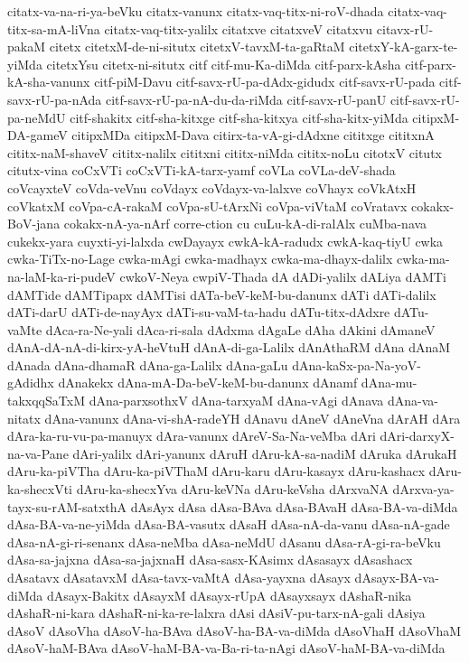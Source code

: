 {citatx-va-na-ri-ya-beVku
citatx-vanunx
citatx-vaq-titx-ni-roV-dhada
citatx-vaq-titx-sa-mA-liVna
citatx-vaq-titx-yalilx
citatxve
citatxveV
citatxvu
citavx-rU-pakaM
citetx
citetxM-de-ni-situtx
citetxV-tavxM-ta-gaRtaM
citetxY-kA-garx-te-yiMda
citetxYsu
citetx-ni-situtx
citf
citf-mu-Ka-diMda
citf-parx-kAsha
citf-parx-kA-sha-vanunx
citf-piM-Davu
citf-savx-rU-pa-dAdx-gidudx
citf-savx-rU-pada
citf-savx-rU-pa-nAda
citf-savx-rU-pa-nA-du-da-riMda
citf-savx-rU-panU
citf-savx-rU-pa-neMdU
citf-shakitx
citf-sha-kitxge
citf-sha-kitxya
citf-sha-kitx-yiMda
citipxM-DA-gameV
citipxMDa
citipxM-Dava
citirx-ta-vA-gi-dAdxne
cititxge
cititxnA
cititx-naM-shaveV
cititx-nalilx
cititxni
cititx-niMda
cititx-noLu
citotxV
citutx
citutx-vina
coCxVTi
coCxVTi-kA-tarx-yamf
coVLa
coVLa-deV-shada
coVcayxteV
coVda-veVnu
coVdayx
coVdayx-va-lalxve
coVhayx
coVkAtxH
coVkatxM
coVpa-cA-rakaM
coVpa-sU-tArxNi
coVpa-viVtaM
coVratavx
cokakx-BoV-jana
cokakx-nA-ya-nArf
corre-ction
cu
cuLu-kA-di-ralAlx
cuMba-nava
cukekx-yara
cuyxti-yi-lalxda
cwDayayx
cwkA-kA-radudx
cwkA-kaq-tiyU
cwka
cwka-TiTx-no-Lage
cwka-mAgi
cwka-madhayx
cwka-ma-dhayx-dalilx
cwka-ma-na-laM-ka-ri-pudeV
cwkoV-Neya
cwpiV-Thada
dA
dADi-yalilx
dALiya
dAMTi
dAMTide
dAMTipapx
dAMTisi
dATa-beV-keM-bu-danunx
dATi
dATi-dalilx
dATi-darU
dATi-de-nayAyx
dATi-su-vaM-ta-hadu
dATu-titx-dAdxre
dATu-vaMte
dAca-ra-Ne-yali
dAca-ri-sala
dAdxma
dAgaLe
dAha
dAkini
dAmaneV
dAnA-dA-nA-di-kirx-yA-heVtuH
dAnA-di-ga-Lalilx
dAnAthaRM
dAna
dAnaM
dAnada
dAna-dhamaR
dAna-ga-Lalilx
dAna-gaLu
dAna-kaSx-pa-Na-yoV-gAdidhx
dAnakekx
dAna-mA-Da-beV-keM-bu-danunx
dAnamf
dAna-mu-takxqqSaTxM
dAna-parxsothxV
dAna-tarxyaM
dAna-vAgi
dAnava
dAna-va-nitatx
dAna-vanunx
dAna-vi-shA-radeYH
dAnavu
dAneV
dAneVna
dArAH
dAra
dAra-ka-ru-vu-pa-manuyx
dAra-vanunx
dAreV-Sa-Na-veMba
dAri
dAri-darxyX-na-va-Pane
dAri-yalilx
dAri-yanunx
dAruH
dAru-kA-sa-nadiM
dAruka
dArukaH
dAru-ka-piVTha
dAru-ka-piVThaM
dAru-karu
dAru-kasayx
dAru-kashacx
dAru-ka-shecxVti
dAru-ka-shecxYva
dAru-keVNa
dAru-keVsha
dArxvaNA
dArxva-ya-tayx-su-rAM-satxthA
dAsAyx
dAsa
dAsa-BAva
dAsa-BAvaH
dAsa-BA-va-diMda
dAsa-BA-va-ne-yiMda
dAsa-BA-vasutx
dAsaH
dAsa-nA-da-vanu
dAsa-nA-gade
dAsa-nA-gi-ri-senanx
dAsa-neMba
dAsa-neMdU
dAsanu
dAsa-rA-gi-ra-beVku
dAsa-sa-jajxna
dAsa-sa-jajxnaH
dAsa-sasx-KAsimx
dAsasayx
dAsashacx
dAsatavx
dAsatavxM
dAsa-tavx-vaMtA
dAsa-yayxna
dAsayx
dAsayx-BA-va-diMda
dAsayx-Bakitx
dAsayxM
dAsayx-rUpA
dAsayxsayx
dAshaR-nika
dAshaR-ni-kara
dAshaR-ni-ka-re-lalxra
dAsi
dAsiV-pu-tarx-nA-gali
dAsiya
dAsoV
dAsoVha
dAsoV-ha-BAva
dAsoV-ha-BA-va-diMda
dAsoVhaH
dAsoVhaM
dAsoV-haM-BAva
dAsoV-haM-BA-va-Ba-ri-ta-nAgi
dAsoV-haM-BA-va-diMda
}
